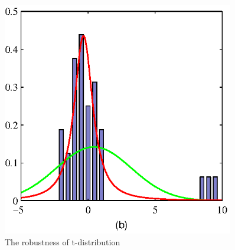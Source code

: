 \documentclass[12pt, a4paper]{article}
\begin{document}
\begin{itemize}
\begin{figure}[htbp]
\begin{minipage}[t]{0.45\textwidth}
                \includegraphics[width=0.9\textwidth]{figures/Figure2_16b.eps}
            \end{minipage}
            \caption{The robustness of t-distribution}
        \end{figure}
    \end{itemize}
\end{document}
